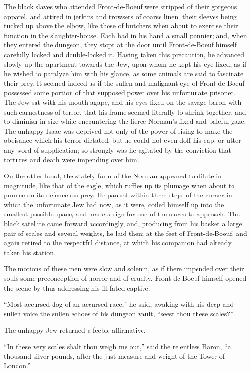 The black slaves who attended Front-de-Boeuf were stripped of their
gorgeous apparel, and attired in jerkins and trowsers of coarse linen,
their sleeves being tucked up above the elbow, like those of butchers
when about to exercise their function in the slaughter-house. Each had
in his hand a small pannier; and, when they entered the dungeon, they
stopt at the door until Front-de-Boeuf himself carefully locked and
double-locked it. Having taken this precaution, he advanced slowly up
the apartment towards the Jew, upon whom he kept his eye fixed, as if he
wished to paralyze him with his glance, as some animals are said to
fascinate their prey. It seemed indeed as if the sullen and malignant
eye of Front-de-Boeuf possessed some portion of that supposed power over
his unfortunate prisoner. The Jew sat with his mouth agape, and his eyes
fixed on the savage baron with such earnestness of terror, that his
frame seemed literally to shrink together, and to diminish in size while
encountering the fierce Norman's fixed and baleful gaze. The unhappy
Isaac was deprived not only of the power of rising to make the obeisance
which his terror dictated, but he could not even doff his cap, or utter
any word of supplication; so strongly was he agitated by the conviction
that tortures and death were impending over him.

On the other hand, the stately form of the Norman appeared to dilate in
magnitude, like that of the eagle, which ruffles up its plumage when
about to pounce on its defenceless prey. He paused within three steps of
the corner in which the unfortunate Jew had now, as it were, coiled
himself up into the smallest possible space, and made a sign for one of
the slaves to approach. The black satellite came forward accordingly,
and, producing from his basket a large pair of scales and several
weights, he laid them at the feet of Front-de-Boeuf, and again retired
to the respectful distance, at which his companion had already taken his
station.

The motions of these men were slow and solemn, as if there impended over
their souls some preconception of horror and of cruelty. Front-de-Boeuf
himself opened the scene by thus addressing his ill-fated captive.

``Most accursed dog of an accursed race,'' he said, awaking with his
deep and sullen voice the sullen echoes of his dungeon vault, ``seest
thou these scales?''

The unhappy Jew returned a feeble affirmative.

``In these very scales shalt thou weigh me out,'' said the relentless
Baron, ``a thousand silver pounds, after the just measure and weight of
the Tower of London.''

